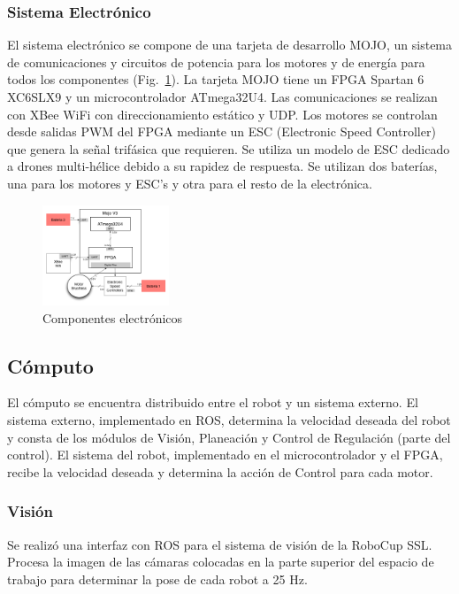\documentclass[twocolumn,10pt]{amrob}
\begin{document}
\subsubsection*{Sistema Electrónico}

El sistema electrónico se compone de una tarjeta de desarrollo MOJO, un sistema de comunicaciones y circuitos de potencia para los motores  y de energía para todos los componentes (Fig.~\ref{fig:electGral}). La tarjeta MOJO tiene un FPGA Spartan 6 XC6SLX9 y un microcontrolador ATmega32U4. Las comunicaciones se realizan con XBee WiFi con direccionamiento estático y UDP. Los motores se controlan desde salidas PWM del FPGA mediante un ESC (Electronic Speed Controller) que genera la señal trifásica que requieren. Se utiliza un modelo de ESC dedicado a drones multi-hélice debido a su rapidez de respuesta. Se utilizan dos baterías, una para los motores y ESC's y otra para el resto de la electrónica.

\begin{figure}
  \centering
    \includegraphics[height=3cm]{diagrama_electronica.png}
  \caption{Componentes electrónicos}
  \label{fig:electGral}
\end{figure}


\subsection*{Cómputo}
\label{sec:sistema_computo}
El cómputo se encuentra distribuido entre el robot y un sistema externo. El sistema externo, implementado en ROS, determina la velocidad deseada del robot y consta de los módulos de Visión, Planeación y Control de Regulación (parte del control). El sistema del robot, implementado en el microcontrolador y el FPGA, recibe la velocidad deseada y determina la acción de Control para cada motor.

\subsubsection*{Visión}
\label{subsec:vision}
Se realizó una interfaz con ROS para el sistema de visión de la RoboCup SSL. Procesa la imagen de las cámaras colocadas en la parte superior del espacio de trabajo para determinar la pose de cada robot a 25 Hz.
\end{document}
